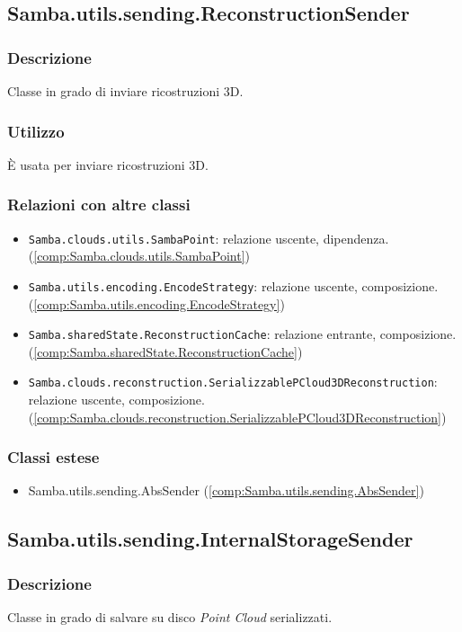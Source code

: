 \subsection{Samba.utils.sending.ReconstructionSender}\label{comp:Samba.utils.sending.ReconstructionSender}
\subsubsection{Descrizione}
Classe in grado di inviare ricostruzioni 3D.
\subsubsection{Utilizzo}
È usata per inviare ricostruzioni 3D.
\subsubsection{Relazioni con altre classi}
\begin{itemize}
	\item \texttt{Samba.clouds.utils.SambaPoint}: relazione uscente, dipendenza. (\ref{comp:Samba.clouds.utils.SambaPoint})
	\item \texttt{Samba.utils.encoding.EncodeStrategy}: relazione uscente, composizione. (\ref{comp:Samba.utils.encoding.EncodeStrategy})
	\item \texttt{Samba.sharedState.ReconstructionCache}: relazione entrante, composizione. (\ref{comp:Samba.sharedState.ReconstructionCache})
	\item \texttt{Samba.clouds.reconstruction.SerializzablePCloud3DReconstruction}: relazione uscente, composizione. (\ref{comp:Samba.clouds.reconstruction.SerializzablePCloud3DReconstruction})
\end{itemize}
\subsubsection{Classi estese}
\begin{itemize}
	\item Samba.utils.sending.AbsSender (\ref{comp:Samba.utils.sending.AbsSender})
\end{itemize}

\subsection{Samba.utils.sending.InternalStorageSender}\label{comp:Samba.utils.sending.InternalStorageSender}
\subsubsection{Descrizione}
Classe in grado di salvare su disco \emph{Point Cloud} serializzati.
